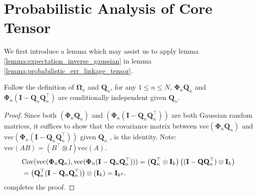 \section{Probabilistic Analysis of Core Tensor}
We first introduce a lemma which may assist us to apply lemma \ref{lemma:expectation_inverse_gaussian} in lemma \ref{lemma:probabilistic_err_linkage_tensor}. 
\begin{lem}
\label{lemma:indepence_for_pseduo_inverse}
Follow the definition of $\mathbf{\Omega}_n$ and $\mathbf{Q}_n$, 
for any $1\le n\le N$, $\mathbf{\Phi}_n \mathbf{Q}_n$ and 
$\mathbf{\Phi}_n (\mathbf{I} - \mathbf{Q}_n\mathbf{Q}_n^\top)$ are conditionally independent given $\mathbf{Q}_n$. 
\begin{proof}
Since both $(\mathbf{\Phi}_n \mathbf{Q}_n)$ and $(\mathbf{\Phi}_n (\mathbf{I} -\mathbf{Q}_n\mathbf{Q}_n^\top))$ are both Gaussian random matrices, it suffices to show that the covariance matrix between $\mbox{vec}(\mathbf{\Phi}_n \mathbf{Q}_n)$ and $\mbox{vec}(\mathbf{\Phi}_n (\mathbf{I} -\mathbf{Q}_n\mathbf{Q}_n^\top))$ given $\mathbf{Q}_n$ , is the identity. Note: $\mbox{vec}(AB) = (B^\top \otimes I)\mbox{vec}(A)$. 
\begin{equation}
\begin{aligned}
&\mbox{Cov}(\mbox{vec}(\mathbf{\Phi}_n \mathbf{Q}_n), \mbox{vec}(\mathbf{\Phi}_n (\mathbf{I} -\mathbf{Q}_n\mathbf{Q}_n^\top)))  = \left(\mathbf{Q}_n^\top \otimes \mathbf{I}_k\right)\left((\mathbf{I} - \mathbf{Q}\mathbf{Q}_n^\top) \otimes \mathbf{I}_k\right)\\
&=\left(\mathbf{Q}_n^\top(\mathbf{I} - \mathbf{Q}_n\mathbf{Q}_n^\top)  \right)\otimes \left(\mathbf{I}_k\right) = \mathbf{I}_{k^2}. 
\end{aligned}
\end{equation}
completes the proof. 
\end{proof}
\end{lem}

